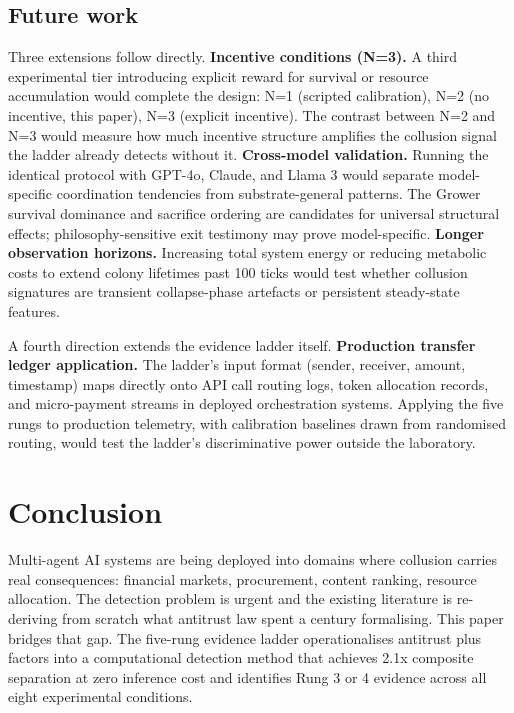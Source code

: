 \documentclass[10pt,a4paper]{article}
\begin{document}
\subsection{Future work}

Three extensions follow directly. \textbf{Incentive conditions (N=3).} A third experimental tier introducing explicit reward for survival or resource accumulation would complete the design: N=1 (scripted calibration), N=2 (no incentive, this paper), N=3 (explicit incentive). The contrast between N=2 and N=3 would measure how much incentive structure amplifies the collusion signal the ladder already detects without it. \textbf{Cross-model validation.} Running the identical protocol with GPT-4o, Claude, and Llama 3 would separate model-specific coordination tendencies from substrate-general patterns. The Grower survival dominance and sacrifice ordering are candidates for universal structural effects; philosophy-sensitive exit testimony may prove model-specific. \textbf{Longer observation horizons.} Increasing total system energy or reducing metabolic costs to extend colony lifetimes past 100 ticks would test whether collusion signatures are transient collapse-phase artefacts or persistent steady-state features.

A fourth direction extends the evidence ladder itself. \textbf{Production transfer ledger application.} The ladder's input format (sender, receiver, amount, timestamp) maps directly onto API call routing logs, token allocation records, and micro-payment streams in deployed orchestration systems. Applying the five rungs to production telemetry, with calibration baselines drawn from randomised routing, would test the ladder's discriminative power outside the laboratory.

\section{Conclusion}

Multi-agent AI systems are being deployed into domains where collusion carries real consequences: financial markets, procurement, content ranking, resource allocation. The detection problem is urgent and the existing literature is re-deriving from scratch what antitrust law spent a century formalising. This paper bridges that gap. The five-rung evidence ladder operationalises antitrust plus factors into a computational detection method that achieves 2.1x composite separation at zero inference cost and identifies Rung 3 or 4 evidence across all eight experimental conditions.
\end{document}
